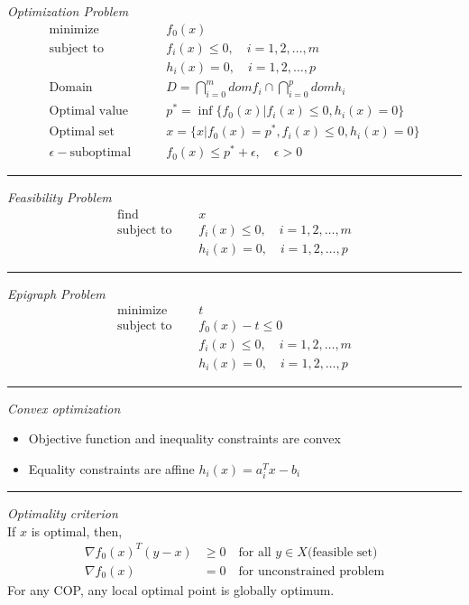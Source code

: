 \noindent
\textit{Optimization Problem}
\begin{align*}
\mbox{minimize }\quad &f_0(x)\\
\mbox{subject to }\quad &f_i(x) \le 0, \quad i = 1, 2, \ldots, m\\
&h_i(x) = 0, \quad i = 1, 2, \ldots, p\\
\mbox{Domain} \qquad
&D = \bigcap_{i=0}^m dom f_i \cap \bigcap_{i=0}^p dom h_i\\
\mbox{Optimal value}\qquad
&p^* = \inf\{f_0(x) | f_i(x) \le 0, h_i(x) = 0\}\\
\mbox{Optimal set}\qquad 
&x = \{x | f_0(x) = p^*, f_i(x) \le 0, h_i(x) = 0\}\\
\epsilon-\mbox{suboptimal} \qquad
&f_0(x) \le p^* + \epsilon, \quad \epsilon > 0
\end{align*}
\rule{\linewidth}{0.1mm}
%
\noindent
\textit{Feasibility Problem}
\begin{align*}
\mbox{find }\quad & x\\
\mbox{subject to }\quad &f_i(x) \le 0, \quad i = 1, 2, \ldots, m\\
&h_i(x) = 0, \quad i = 1, 2, \ldots, p
\end{align*}
\rule{\linewidth}{0.1mm}
%
\noindent
\textit{Epigraph Problem}
\begin{align*}
\mbox{minimize }\quad &t\\
\mbox{subject to }\quad &f_0(x) - t \le 0\\
&f_i(x) \le 0, \quad i = 1, 2, \ldots, m\\
&h_i(x) = 0, \quad i = 1, 2, \ldots, p
\end{align*}
\rule{\linewidth}{0.1mm}
%
\noindent
\textit{Convex optimization}
\begin{itemize}
\item Objective function and inequality constraints are convex
\item Equality constraints are affine \(h_i(x) = a_i^T x - b_i\)
\end{itemize}
\rule{\linewidth}{0.1mm}
%
%
\noindent
\textit{Optimality criterion}\\
\indent If \(x\) is optimal, then,
\begin{align*}
  \nabla f_0(x)^T (y-x) &\ge 0 \quad
  \mbox{for all } y \in X \mbox{(feasible set)}\\
  \nabla f_0(x) &= 0 \quad \mbox{for unconstrained problem}
\end{align*}
For any COP, any local optimal point is globally optimum.\\
